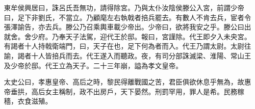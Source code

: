 東牟侯興居曰，誅呂氏吾無功，請得除宮。乃與太仆汝陰侯滕公入宮，前謂少帝曰，足下非劉氏，不當立。乃顧麾左右執戟者掊兵罷去。有數人不肯去兵，宦者令張澤諭告，亦去兵。滕公乃召乘輿車載少帝出。少帝曰，欲將我安之乎。滕公曰出就舍。舍少府。乃奉天子法駕，迎代王於邸。報曰，宮謹除。代王即夕入未央宮。有謁者十人持戟衛端門，曰，天子在也，足下何為者而入。代王乃謂太尉。太尉往諭，謁者十人皆掊兵而去。代王遂入而聽政。夜，有司分部誅滅梁、淮陽、常山王及少帝於邸。代王立為天子。二十三年崩，謚為孝文皇帝。

太史公曰，孝惠皇帝、高后之時，黎民得離戰國之苦，君臣俱欲休息乎無為，故惠帝垂拱，高后女主稱制，政不出房戶，天下晏然。刑罰罕用，罪人是希。民務稼穡，衣食滋殖。